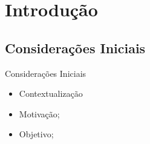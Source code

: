 \renewcommand{\titulo}{Introdução}
\section{\titulo}

\renewcommand{\titulo}{Considerações Iniciais}
\subsection{\titulo}
\begin{frame}{\titulo}
\begin{itemize}
\item Contextualização
\item Motivação;
\item Objetivo;
\end{itemize}
\end{frame}
